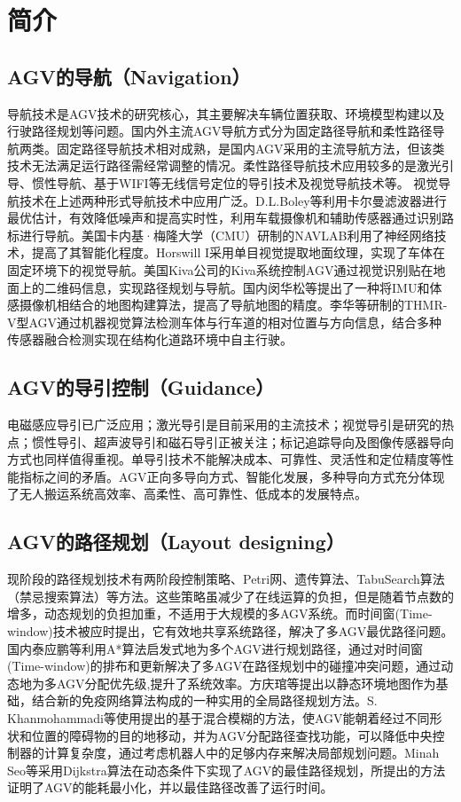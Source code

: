 \documentclass[cs4size,a4paper]{ctexart}
\numberwithin{equation}{section}
\numberwithin{table}{section}
\numberwithin{figure}{section}
\begin{document}
\section{简介}
\subsection{AGV的导航（Navigation）}
导航技术是AGV技术的研究核心，其主要解决车辆位置获取、环境模型构建以及行驶路径规划等问题。国内外主流AGV导航方式分为固定路径导航和柔性路径导航两类。固定路径导航技术相对成熟，是国内AGV采用的主流导航方法，但该类技术无法满足运行路径需经常调整的情况。柔性路径导航技术应用较多的是激光引导、惯性导航、基于WIFI等无线信号定位的导引技术及视觉导航技术等。
视觉导航技术在上述两种形式导航技术中应用广泛。D.L.Boley等利用卡尔曼滤波器进行最优估计，有效降低噪声和提高实时性，利用车载摄像机和辅助传感器通过识别路标进行导航。美国卡内基·梅隆大学（CMU）研制的NAVLAB利用了神经网络技术，提高了其智能化程度。Horswill I采用单目视觉提取地面纹理，实现了车体在固定环境下的视觉导航。美国Kiva公司的Kiva系统控制AGV通过视觉识别贴在地面上的二维码信息，实现路径规划与导航。国内闵华松等提出了一种将IMU和体感摄像机相结合的地图构建算法，提高了导航地图的精度。李华等研制的THMR-V型AGV通过机器视觉算法检测车体与行车道的相对位置与方向信息，结合多种传感器融合检测实现在结构化道路环境中自主行驶。

\subsection{AGV的导引控制（Guidance）}
电磁感应导引已广泛应用；激光导引是目前采用的主流技术；视觉导引是研究的热点；惯性导引、超声波导引和磁石导引正被关注；标记追踪导向及图像传感器导向方式也同样值得重视。单导引技术不能解决成本、可靠性、灵活性和定位精度等性能指标之间的矛盾。AGV正向多导向方式、智能化发展，多种导向方式充分体现了无人搬运系统高效率、高柔性、高可靠性、低成本的发展特点。

\subsection{AGV的路径规划（Layout designing）}
现阶段的路径规划技术有两阶段控制策略、Petri网、遗传算法、TabuSearch算法（禁忌搜索算法）等方法。这些策略虽减少了在线运算的负担，但是随着节点数的增多，动态规划的负担加重，不适用于大规模的多AGV系统。而时间窗(Time-window)技术被应时提出，它有效地共享系统路径，解决了多AGV最优路径问题。
国内泰应鹏等利用A*算法启发式地为多个AGV进行规划路径，通过对时间窗(Time-window)的排布和更新解决了多AGV在路径规划中的碰撞冲突问题，通过动态地为多AGV分配优先级,提升了系统效率。方庆琯等提出以静态环境地图作为基础，结合新的免疫网络算法构成的一种实用的全局路径规划方法。S. Khanmohammadi等使用提出的基于混合模糊的方法，使AGV能朝着经过不同形状和位置的障碍物的目的地移动，并为AGV分配路径查找功能，可以降低中央控制器的计算复杂度，通过考虑机器人中的足够内存来解决局部规划问题。Minah Seo等采用Dijkstra算法在动态条件下实现了AGV的最佳路径规划，所提出的方法证明了AGV的能耗最小化，并以最佳路径改善了运行时间。
\end{document}
